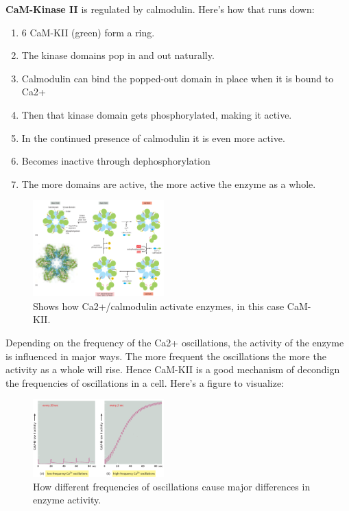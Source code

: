 \documentclass[../main.tex]{subfiles}
\begin{document}
\textbf{CaM-Kinase II} is regulated by calmodulin. Here's how that runs down:
\begin{enumerate}
	\item 6 CaM-KII (green) form a ring. 
	\item The kinase domains pop in and out naturally.
	\item Calmodulin can bind the popped-out domain in place when it is bound to Ca2+
	\item Then that kinase domain gets phosphorylated, making it active.
	\item In the continued presence of calmodulin it is even more active.
	\item Becomes inactive through dephosphorylation
	\item The more domains are active, the more active the enzyme as a whole.
\end{enumerate}
\begin{figure}[H]
	\centering
	\includegraphics[width=0.45\textwidth]{Ca2_cam}
	\caption{Shows how Ca2+/calmodulin activate enzymes, in this case CaM-KII.}
\end{figure}

Depending on the frequency of the Ca2+ oscillations, the activity of the enzyme is influenced in major ways. The more frequent the oscillations the more the activity as a whole will rise. Hence CaM-KII is a good mechanism of decondign the frequencies of oscillations in a cell. Here's a figure to visualize:
\begin{figure}[H]
	\centering
	\includegraphics[width=0.45\textwidth]{Ca2_osc}
	\caption{How different frequencies of oscillations cause major differences in enzyme activity.}
\end{figure}
\end{document}
